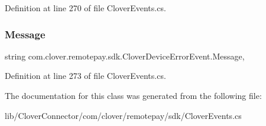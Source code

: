 Definition at line 270 of file Clover\+Events.\+cs.

\mbox{\label{classcom_1_1clover_1_1remotepay_1_1sdk_1_1_clover_device_error_event_ae116a3f38e23253e8fc1d49299c1cae6}} 
\subsubsection{\texorpdfstring{Message}{Message}}
{\footnotesize\ttfamily string com.\+clover.\+remotepay.\+sdk.\+Clover\+Device\+Error\+Event.\+Message\hspace{0.3cm}{\ttfamily [get]}, {\ttfamily [set]}}



Definition at line 273 of file Clover\+Events.\+cs.



The documentation for this class was generated from the following file\+:\begin{DoxyCompactItemize}
\item 
lib/\+Clover\+Connector/com/clover/remotepay/sdk/Clover\+Events.\+cs\end{DoxyCompactItemize}
